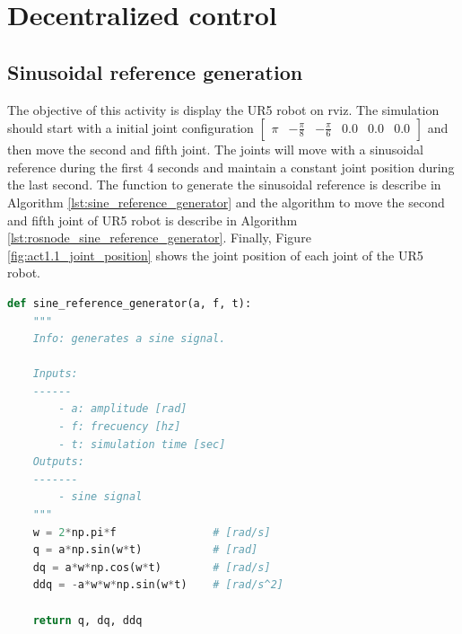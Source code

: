 \section{Decentralized control}
\subsection{Sinusoidal reference generation}
The objective of this activity is display the UR5 robot on rviz. The simulation should start with a initial joint configuration $\begin{bmatrix} \pi & -\frac{\pi}{8} & -\frac{\pi}{6} & 0.0 & 0.0 & 0.0 \end{bmatrix}$ and then move the second and fifth joint. The joints will move with a sinusoidal reference during the first 4 seconds and maintain a constant joint position during the last second. The function to generate the sinusoidal reference is describe in Algorithm \ref{lst:sine_reference_generator} and the algorithm to move the second and fifth joint of UR5 robot is describe in Algorithm \ref{lst:rosnode_sine_reference_generator}. Finally, Figure \ref{fig:act1.1_joint_position} shows the joint position of each joint of the UR5 robot.

\begin{lstlisting}[language=Python,caption=Function to generate sinusoidal reference., label={lst:sine_reference_generator}]
def sine_reference_generator(a, f, t):
    """
    Info: generates a sine signal.

    Inputs: 
    ------
        - a: amplitude [rad]
        - f: frecuency [hz]
        - t: simulation time [sec]
    Outputs:
    -------
        - sine signal
    """
    w = 2*np.pi*f               # [rad/s]
    q = a*np.sin(w*t)           # [rad]
    dq = a*w*np.cos(w*t)        # [rad/s]
    ddq = -a*w*w*np.sin(w*t)    # [rad/s^2]

    return q, dq, ddq
\end{lstlisting}


